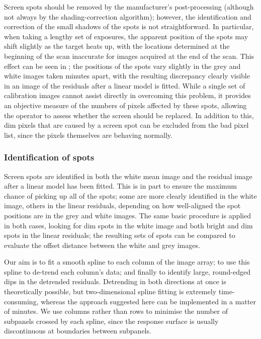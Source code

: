 \documentclass[\main/IO-Pixels.tex]{subfiles}
\begin{document}
Screen spots should be removed by the manufacturer's post-processing (although not always by the shading-correction algorithm); however, the identification and correction of the small shadows of the spots is not straightforward. In particular, when taking a lengthy set of exposures, the apparent position of the spots may shift slightly as the target heats up, with the locations determined at the beginning of the scan inaccurate for images acquired at the end of the scan. This effect can be seen in ; the positions of the spots vary slightly in the grey and white images taken  minutes apart, with the resulting discrepancy clearly visible in an image of the residuals after a linear model is fitted.  While a single set of calibration images cannot assist directly in overcoming this problem, it provides an objective measure of the numbers of pixels affected by these spots, allowing the operator to assess whether the screen should be replaced. In addition to this, dim pixels that are caused by a screen spot can be excluded from the bad pixel list, since the pixels themselves are behaving normally.

\subsubsection{Identification of spots}

Screen spots are identified in both the white mean image and the residual image after a linear model has been fitted. This is in part to ensure the maximum chance of picking up all of the spots; some are more clearly identified in the white image, others in the linear residuals, depending on how well-aligned the spot positions are in the grey and white images. The same basic procedure is applied in both cases, looking for dim spots in the white image and both bright and dim spots in the linear residuals; the resulting sets of spots can be compared to evaluate the offset distance between the white and grey images. 

Our aim is to fit a smooth spline to each column of the image array; to use this spline to de-trend each column's data; and finally to identify large, round-edged dips in the detrended residuals. Detrending in both directions at once is theoretically possible, but two-dimensional spline fitting is extremely time-consuming, whereas the approach suggested here can be implemented in a matter of minutes. We use columns rather than rows to minimise the number of subpanels crossed by each spline, since the response surface is usually discontinuous at boundaries between subpanels.
\end{document}
